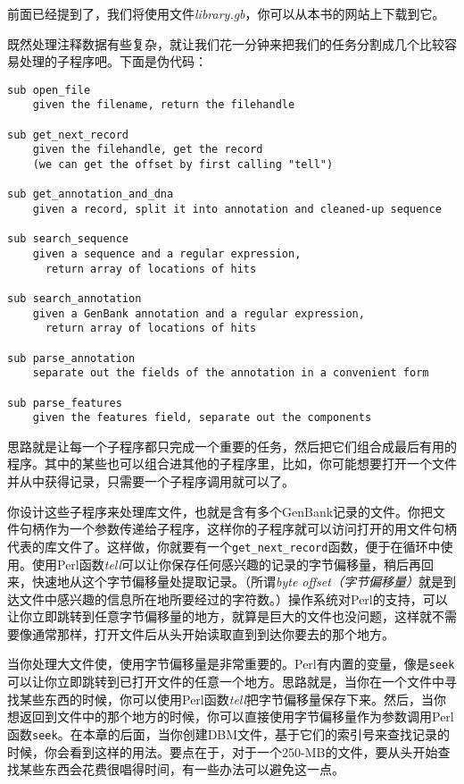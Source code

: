 前面已经提到了，我们将使用文件\textit{library.gb}，你可以从本书的网站上下载到它。

既然处理注释数据有些复杂，就让我们花一分钟来把我们的任务分割成几个比较容易处理的子程序吧。下面是伪代码：

\begin{lstlisting}
sub open_file
    given the filename, return the filehandle

sub get_next_record
    given the filehandle, get the record
    (we can get the offset by first calling "tell")

sub get_annotation_and_dna
    given a record, split it into annotation and cleaned-up sequence

sub search_sequence
    given a sequence and a regular expression,
      return array of locations of hits

sub search_annotation
    given a GenBank annotation and a regular expression,
      return array of locations of hits

sub parse_annotation
    separate out the fields of the annotation in a convenient form

sub parse_features
    given the features field, separate out the components
\end{lstlisting}

思路就是让每一个子程序都只完成一个重要的任务，然后把它们组合成最后有用的程序。其中的某些也可以组合进其他的子程序里，比如，你可能想要打开一个文件并从中获得记录，只需要一个子程序调用就可以了。

你设计这些子程序来处理库文件，也就是含有多个GenBank记录的文件。你把文件句柄作为一个参数传递给子程序，这样你的子程序就可以访问打开的用文件句柄代表的库文件了。这样做，你就要有一个\verb|get_next_record|函数，便于在循环中使用。使用Perl函数\textit{tell}可以让你保存任何感兴趣的记录的字节偏移量，稍后再回来，快速地从这个字节偏移量处提取记录。（所谓\textit{byte offset（字节偏移量）}就是到达文件中感兴趣的信息所在地所要经过的字符数。）操作系统对Perl的支持，可以让你立即跳转到任意字节偏移量的地方，就算是巨大的文件也没问题，这样就不需要像通常那样，打开文件后从头开始读取直到到达你要去的那个地方。

当你处理大文件使，使用字节偏移量是非常重要的。Perl有内置的变量，像是\verb|seek|可以让你立即跳转到已打开文件的任意一个地方。思路就是，当你在一个文件中寻找某些东西的时候，你可以使用Perl函数\textit{tell}把字节偏移量保存下来。然后，当你想返回到文件中的那个地方的时候，你可以直接使用字节偏移量作为参数调用Perl函数\verb|seek|。在本章的后面，当你创建DBM文件，基于它们的索引号来查找记录的时候，你会看到这样的用法。要点在于，对于一个250-MB的文件，要从头开始查找某些东西会花费很唱得时间，有一些办法可以避免这一点。

